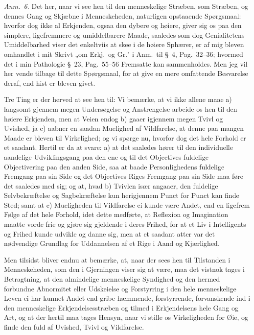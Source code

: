 \documentclass[12pt,a4paper]{book}
\newcommand{\apage}[1]{\marginnote{\footnotesize\textit{[#1]}}}
\begin{document}
{\small\emph{Anm.~6.} Det her, naar vi see hen til den menneskelige Stræben, som
Stræben, og dennes Gang og Skjæbne i Menneskeheden, naturligen opstaaende
Spørgsmaal: hvorfor dog ikke al Erkjenden, ogsaa den dybere og høiere, giver sig
os paa den simplere, ligefremmere og umiddelbarere Maade, saaledes som dog
Genialitetens Umiddelbarhed viser det enkeltviis at skee i de høiere Sphærer, er
af mig bleven omhandlet i mit Skrivt „om Erkj.\ og Gr." i Anm.\ til \S~4,
Pag.\ 32--36; hvormed det i min Pathologie \S~23, Pag.\ 55--56 Fremsatte kan
sammenholdes. Men jeg vil her vende tilbage til dette Spørgsmaal, for at give en
mere omfattende Besvarelse deraf, end hist er bleven givet.\par}

Tre Ting er der herved at see hen til: Vi bemærke,  \apage{20} at vi ikke allene maae a)
langsomt gjennem megen Undersøgelse og Anstrengelse arbeide os hen til den høiere
Erkjenden, men at Veien endog b) gaaer igjennem megen Tvivl og Uvished, ja c)
aabner en saadan Muelighed af Vildfarelse, at denne paa mangen Maade er bleven
til Virkelighed; og vi spørge nu, hvorfor dog det hele Forhold er et saadant.
Hertil er da at svare: a) at det saaledes hører til den individuelle aandelige
Udviklingsgang paa den ene og til det Objectives fuldelige Objectivering paa den
anden Side, saa at baade Personlighedens fuldelige Fremgang paa sin Side og det
Objectives Riges Fremgang paa sin Side maa føre det saaledes med sig; og at, hvad
b) Tvivlen især angaaer, den fuldelige Selvbekræftelse og Sagbekræftelse kun
herigjennem Punct for Punct kan finde Sted; samt at c) Mueligheden til
Vildfarelse ei kunde være Andet, end en ligefrem Følge af det hele Forhold, idet
dette medførte, at Reflexion og Imagination maatte vorde frie og gjøre sig
gjeldende i deres Frihed, for at et Liv i Intelligents og Frihed kunde udvikle og
danne sig, men at et saadant atter var det nødvendige Grundlag for Uddannelsen af
et Rige i Aand og Kjærlighed.

Men tilsidst bliver endnu at bemærke, at, naar der sees hen til Tilstanden i
Menneskeheden, som den i Gjerningen viser sig at være, maa det vistnok tages i
Betragtning, at den almindelige menneskelige Syndighed og den hermed forbundne
Abnormitet eller Udskeielse og Forstyrring i den hele menneskelige Leven ei har
kunnet Andet end gribe hæmmende, forstyrrende, forvanskende ind i den
menneskelige Erkjendelsesstræben og tilmed i Erkjendelsens hele Gang og Art, og
at der hertil maa tages Hensyn, naar vi stille os Virkeligheden for Øie, og finde
den fuld af Uvished, Tvivl og Vildfarelse.
\end{document}
